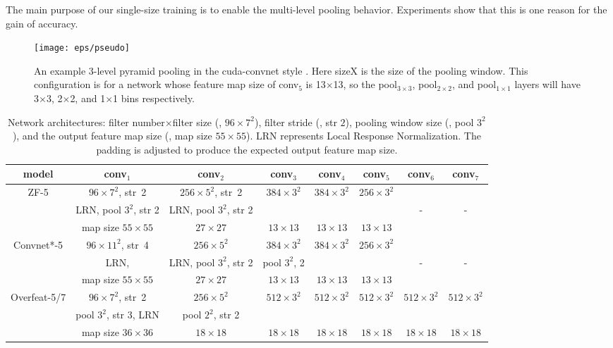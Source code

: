 \documentclass[10pt,journal,cspaper,compsoc]{IEEEtran}
\begin{document}
The main purpose of our single-size training is to enable the multi-level pooling behavior. Experiments show that this is one reason for the gain of accuracy.

\begin{figure}[t]
\center
\texttt{[image: eps/pseudo]}
\caption{An example 3-level pyramid pooling in the cuda-convnet style \cite{Krizhevsky2012}. Here sizeX is the size of the pooling window. This configuration is for a network whose feature map size of conv$_5$ is 13$\times$13, so the pool$_{3\times3}$, pool$_{2\times2}$, and pool$_{1\times1}$ layers will have 3$\times$3, 2$\times$2, and 1$\times$1 bins respectively.}
\label{fig:pseudo}
\end{figure}

\begin{table*}
\begin{center}
\begin{tabular}{c|c|c|c|c|c|c|c}
\hline
model & conv$_1$ & conv$_2$ & conv$_3$ & conv$_4$ & conv$_5$ & conv$_6$ & conv$_7$ \\
\hline
ZF-5 & $96\times7^2$, str~2 & $256\times5^2$, str~2 & $384\times3^2$ & $384\times3^2$ & $256\times3^2$ &  &  \\
          & LRN, pool $3^2$, str 2 & LRN, pool $3^2$, str 2 &  &  &  & - & - \\
   & map size $55\times55$ & $27\times27$ & $13\times13$ & $13\times13$ & $13\times13$ &  &  \\
\hline
Convnet*-5 & $96\times11^2$, str~4 & $256\times5^2$ & $384\times3^2$ & $384\times3^2$ & $256\times3^2$ &  &  \\
          & LRN, & LRN, pool $3^2$, str 2 & pool $3^2$, 2 &  &  & - & - \\
   & map size $55\times55$ & $27\times27$ & $13\times13$ & $13\times13$ & $13\times13$ &  &  \\
\hline
Overfeat-5/7 & $96\times7^2$, str~2 & $256\times5^2$ & $512\times3^2$ & $512\times3^2$ & $512\times3^2$ & $512\times3^2$ & $512\times3^2$\\
          & pool $3^2$, str 3, LRN & pool $2^2$, str 2 &  &  &  &  &  \\
   & map size $36\times36$ & $18\times18$ & $18\times18$ & $18\times18$ & $18\times18$ & $18\times18$ & $18\times18$\\
\hline
\end{tabular}
\end{center}
\caption{Network architectures: filter number$\times$filter size (\eg, $96\times7^2$), filter stride (\eg, str $2$), pooling window size (\eg, pool $3^2$), and the output feature map size (\eg, map size $55\times55$). LRN represents Local Response Normalization. The padding is adjusted to produce the expected output feature map size.}
\label{tab:architectures}
\end{table*}
\end{document}
